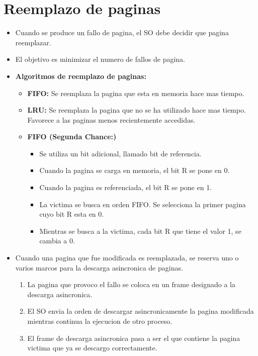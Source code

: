 \documentclass[12pt]{article}
\begin{document}
\section{Reemplazo de paginas}
\begin{itemize}
    \item Cuando se produce un fallo de pagina, el SO debe decidir que pagina reemplazar.
    \item El objetivo es minimizar el numero de fallos de pagina.
    \item \textbf{Algoritmos de reemplazo de paginas:}
        \begin{itemize}
            \item \textbf{FIFO:} Se reemplaza la pagina que esta en memoria hace mas tiempo.
            \item \textbf{LRU:} Se reemplaza la pagina que no se ha utilizado hace mas tiempo. Favorece a las paginas menos recientemente accedidas.
            \item \textbf{FIFO (Segunda Chance:)} 
                \begin{itemize}
                    \item Se utiliza un bit adicional, llamado bit de referencia.
                    \item Cuando la pagina se carga en memoria, el bit R se pone en 0.
                    \item Cuando la pagina es referenciada, el bit R se pone en 1.
                    \item La victima se busca en orden FIFO. Se selecciona la primer pagina cuyo bit R esta en 0.
                    \item Mientras se busca a la victima, cada bit R que tiene el valor 1, se cambia a 0.
                \end{itemize}
        \end{itemize}
        \item Cuando una pagina que fue modificada es reemplazada, se reserva uno o varios marcos para la descarga asincronica de paginas.
            \begin{enumerate}
                \item La pagina que provoco el fallo se coloca en un frame designado a la descarga asincronica.
                \item El SO envia la orden de descargar asincronicamente la pagina modificada mientras continua la ejecucion de otro proceso.
                \item El frame de descarga asincronica pasa a ser el que contiene la pagina victima que ya se descargo correctamente.
            \end{enumerate}
\end{itemize}
\end{document}
